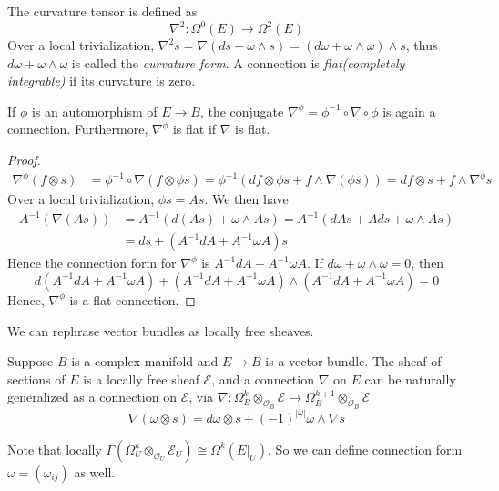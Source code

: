 \begin{definition}[Curvature]\label{def: curvature}
The curvature tensor is defined as
\[\nabla^2:\Omega^0(E)\to\Omega^2(E)\]
Over a local trivialization, $\nabla^2s=\nabla(ds+\omega\wedge s)=(d\omega+\omega\wedge\omega)\wedge s$, thus $d\omega+\omega\wedge\omega$ is called the \textit{curvature form}. A connection is \textit{flat(completely integrable)} if its curvature is zero.
\end{definition}

\begin{proposition}\label{prop: conjugate connection}
If $\phi$ is an automorphism of $E\to B$, the conjugate $\nabla^\phi=\phi^{-1}\circ\nabla\circ\phi$ is again a connection. Furthermore, $\nabla^\phi$ is flat if $\nabla$ is flat.
\end{proposition}

\begin{proof}
\begin{align*}
\nabla^\phi(f\otimes s)&=\phi^{-1}\circ\nabla(f\otimes\phi s)=\phi^{-1}(df\otimes \phi s+f\wedge \nabla(\phi s))=df\otimes s+f\wedge\nabla^\phi s
\end{align*}
Over a local trivialization, $\phi s=As$. We then have
\begin{align*}
A^{-1}(\nabla(As))&=A^{-1}(d(As)+\omega\wedge As)=A^{-1}(dAs+Ads+\omega\wedge As)\\
&=ds+(A^{-1}dA+A^{-1}\omega A)s
\end{align*}
Hence the connection form for $\nabla^\phi$ is $A^{-1}dA+A^{-1}\omega A$. If $d\omega+\omega\wedge\omega=0$, then
\[
d(A^{-1}dA+A^{-1}\omega A)+(A^{-1}dA+A^{-1}\omega A)\wedge(A^{-1}dA+A^{-1}\omega A)=0
\]
Hence, $\nabla^\phi$ is a flat connection.
\end{proof}

We can rephrase vector bundles as locally free sheaves.

\begin{definition}
Suppose $B$ is a complex manifold and $E\to B$ is a vector bundle. The sheaf of sections of $E$ is a locally free sheaf $\mathcal E$, and a connection $\nabla$ on $E$ can be naturally generalized as a connection on $\mathcal E$, via $\nabla:\Omega_B^k\otimes_{\mathcal O_B}\mathcal E\to\Omega_B^{k+1}\otimes_{\mathcal O_B}\mathcal E$
\[
\nabla (\omega\otimes s)=d\omega\otimes s+(-1)^{|\omega|}\omega\wedge\nabla s
\]
\end{definition}

Note that locally $\Gamma(\Omega^k_U\otimes_{\mathcal O_U}\mathcal E_U)\cong\Omega^k(E|_U)$. So we can define connection form $\omega=(\omega_{ij})$ as well.

